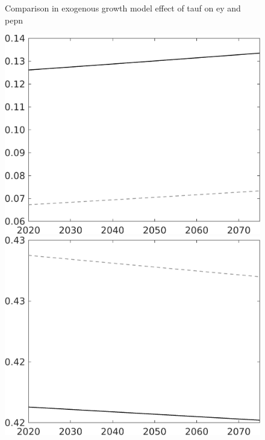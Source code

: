 \documentclass[12pt]{article}
\begin{document}
\begin{figure}{Comparison in exogenous growth model effect of tauf on ey and pepn }
		\begin{minipage}[]{0.32\textwidth}
			\includegraphics[width=1\textwidth]{../../codding_model/own_basedOnFried/optimalPol_010922_revision/figures/all_13Sept22/LevTaufNoTauf_TaulCalib_Equlab_regime0_pepn_spillover0_nsk0_xgr1_knspil1_sep0_LFlimit0_emsbase0_countec0_GovRev0_etaa0.79_lgd0.png}
		\end{minipage}
		\begin{minipage}[]{0.32\textwidth}
			\includegraphics[width=1\textwidth]{../../codding_model/own_basedOnFried/optimalPol_010922_revision/figures/all_13Sept22/LevTaufNoTauf_TaulCalib_Equlab_regime0_EY_spillover0_nsk0_xgr1_knspil1_sep0_LFlimit0_emsbase0_countec0_GovRev0_etaa0.79_lgd0.png}

\end{minipage}
\end{figure}
\end{document}
